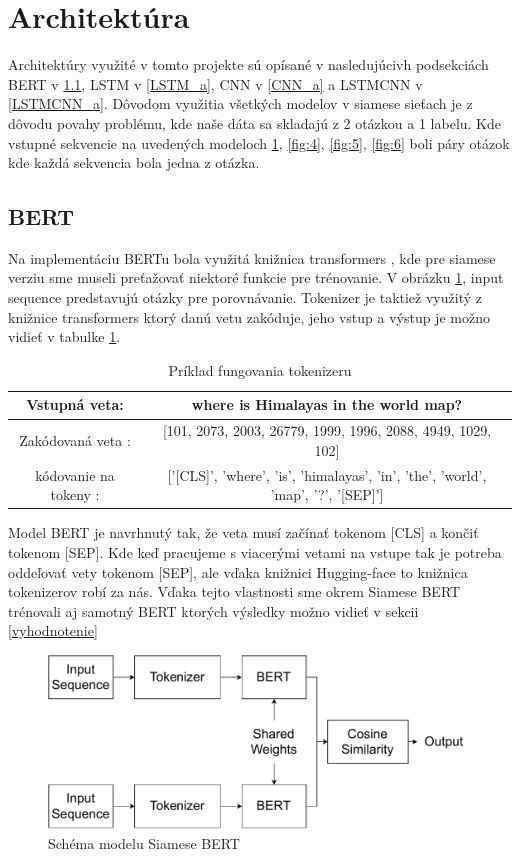 \documentclass[a4paper, 16pt]{article}
\begin{document}
\section{Architektúra}
\label{architektura}

Architektúry využité v tomto projekte sú opísané v nasledujúcivh podsekciách BERT v \ref{BERT_a}, LSTM v \ref{LSTM_a}, CNN v \ref{CNN_a} a LSTMCNN v \ref{LSTMCNN_a}. Dôvodom využitia všetkých modelov v siamese sieťach je z dôvodu povahy problému, kde naše dáta sa skladajú z 2 otázkou a 1 labelu. Kde vstupné sekvencie na uvedených modeloch \ref{fig:3}, \ref{fig:4}, \ref{fig:5}, \ref{fig:6} boli páry otázok kde každá sekvencia bola jedna z otázka.

\subsection{BERT}
\label{BERT_a}
Na implementáciu BERTu bola využitá knižnica transformers \cite{transformers}, kde pre siamese verziu sme museli preťažovať niektoré funkcie pre trénovanie. V obrázku \ref{fig:3}, input sequence predstavujú otázky pre porovnávanie. Tokenizer je taktiež využitý z knižnice transformers ktorý danú vetu zakóduje, jeho vstup a výstup je možno vidieť v tabulke \ref{table:tokenizer}.

\begin{table}[H]
\centering
\begin{tabular}{ |c|c| } \hline
Vstupná veta: & where is Himalayas in the world map?\\ \hline
Zakódovaná veta : & [101, 2073, 2003, 26779, 1999, 1996, 2088, 4949, 1029, 102]\\ \hline
kódovanie na tokeny : & ['[CLS]', 'where', 'is', 'himalayas', 'in', 'the', 'world', 'map', '?', '[SEP]']\\ \hline
\end{tabular}
\caption{Príklad fungovania tokenizeru}
\label{table:tokenizer}
\end{table}

Model BERT je navrhnutý tak, že veta musí začínať tokenom [CLS] a končiť tokenom [SEP]. Kde keď pracujeme s viacerými vetami na vstupe tak je potreba oddeľovať vety tokenom [SEP], ale vďaka knižnici Hugging-face to knižnica tokenizerov robí za nás.
Vďaka tejto vlastnosti sme okrem Siamese BERT trénovali aj samotný BERT ktorých výsledky možno vidieť v sekcii \ref{vyhodnotenie}

\begin{figure}[H]
    \centering
    \includegraphics[width=15cm]{imgs/BERT.pdf}
    \caption{Schéma modelu Siamese BERT}
    \label{fig:3}
\end{figure}
\end{document}

